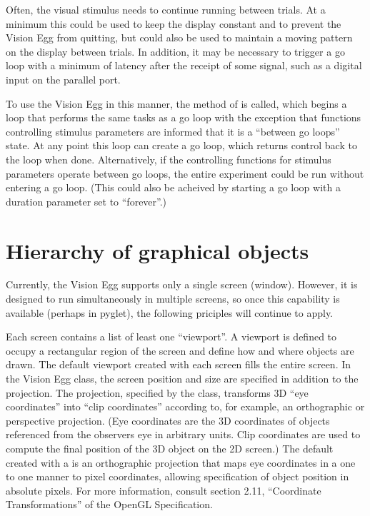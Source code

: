 \documentclass{manual}
\begin{document}
Often, the visual stimulus needs to continue running between trials.
At a minimum this could be used to keep the display constant and to
prevent the Vision Egg from quitting, but could also be used to
maintain a moving pattern on the display between trials.  In addition,
it may be necessary to trigger a go loop with a minimum of latency
after the receipt of some signal, such as a digital input on the
parallel port.

To use the Vision Egg in this manner, the 
method of  is called, which begins a loop that
performs the same tasks as a go loop with the exception that functions
controlling stimulus parameters are informed that it is a ``between go
loops'' state.  At any point this  loop can create
a go loop, which returns control back to the  loop
when done.  Alternatively, if the controlling functions for stimulus
parameters operate between go loops, the entire experiment could be
run without entering a go loop.  (This could also be acheived by
starting a go loop with a duration parameter set to ``forever''.)

\chapter{Hierarchy of graphical objects \label{hierarchy}}

Currently, the Vision Egg supports only a single screen (window).
However, it is designed to run simultaneously in multiple screens, so
once this capability is available (perhaps in pyglet), the following
priciples will continue to apply.

Each screen contains a list of least one ``viewport''. A viewport is
defined to occupy a rectangular region of the screen and define how
and where objects are drawn. The default viewport created with each
screen fills the entire screen. In the Vision Egg 
class, the screen position and size are specified in addition to the
projection.  The projection, specified by the 
class, transforms 3D ``eye coordinates'' into ``clip coordinates''
according to, for example, an orthographic or perspective projection.
(Eye coordinates are the 3D coordinates of objects referenced from the
observers eye in arbitrary units.  Clip coordinates are used to
compute the final position of the 3D object on the 2D screen.)  The
default  created with a  is an
orthographic projection that maps eye coordinates in a one to one
manner to pixel coordinates, allowing specification of object position
in absolute pixels. For more information, consult section 2.11,
``Coordinate Transformations'' of the OpenGL Specification.
\end{document}
